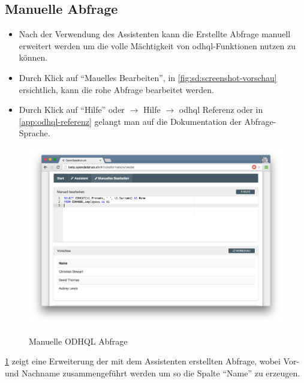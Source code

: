 \subsection{Manuelle Abfrage}

\begin{itemize}
\item Nach der Verwendung des Assistenten kann die Erstellte Abfrage manuell erweitert werden um die volle Mächtigkeit von \acs{odhql}-Funktionen nutzen zu können. 
\item Durch Klick auf ``Mauelles Bearbeiten'', in \cref{fig:sd:screenshot-vorschau} ersichtlich, kann die rohe Abfrage bearbeitet werden.
\item Durch Klick auf ``Hilfe'' oder  $\to$ Hilfe $\to$ \acs{odhql} Referenz oder in \vref{app:odhql-referenz} gelangt man auf die Dokumentation der Abfrage-Sprache.
\end{itemize}

\begin{figure}[H]
	\centering
	\includegraphics[width=\linewidth]{fig/screenshot-manuelles-bearbeiten}
	\label{fig:sd:screenshot-manuelles-bearbeiten}
	\caption{Manuelle ODHQL Abfrage}
\end{figure}

\cref{fig:sd:screenshot-manuelles-bearbeiten} zeigt eine Erweiterung der mit dem Assistenten erstellten Abfrage, wobei Vor- und Nachname zusammengeführt werden um so die Spalte ``Name'' zu erzeugen.
